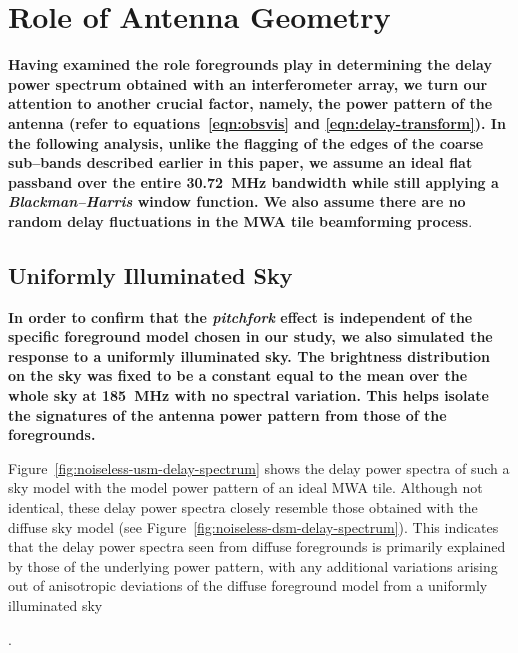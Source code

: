\documentclass[preprint2,iop,numberedappendix]{emulateapj}
\begin{document}
\section{Role of Antenna Geometry}\label{sec:antenna-shape}

{\bf Having examined the role foregrounds play in determining the delay power spectrum obtained with an interferometer array, we turn our attention to another crucial factor, namely, the power pattern of the antenna (refer to equations~\ref{eqn:obsvis} and \ref{eqn:delay-transform}). In the following analysis, unlike the flagging of the edges of the coarse sub--bands described earlier in this paper, we assume an ideal flat passband over the entire 30.72~MHz bandwidth while still applying a {\it Blackman--Harris} window function. We also assume there are no random delay fluctuations in the MWA tile beamforming process}. 

\subsection{Uniformly Illuminated Sky}\label{sec:USM}

{\bf In order to confirm that the {\it pitchfork} effect is independent of the specific foreground model chosen in our study, we also simulated the response to a uniformly illuminated sky. The brightness distribution on the sky was fixed to be a constant equal to the mean over the whole sky at 185~MHz with no spectral variation. This helps isolate the signatures of the antenna power pattern from those of the foregrounds.


Figure~\ref{fig:noiseless-usm-delay-spectrum} shows the delay power spectra of such a sky model with the model power pattern of an ideal MWA tile. Although not identical, these delay power spectra closely resemble those obtained with the diffuse sky model (see Figure~\ref{fig:noiseless-dsm-delay-spectrum}). This indicates that the delay power spectra seen from diffuse foregrounds is primarily explained by those of the underlying power pattern, with any additional variations arising out of anisotropic deviations of the diffuse foreground model from a uniformly illuminated sky}.
\end{document}
